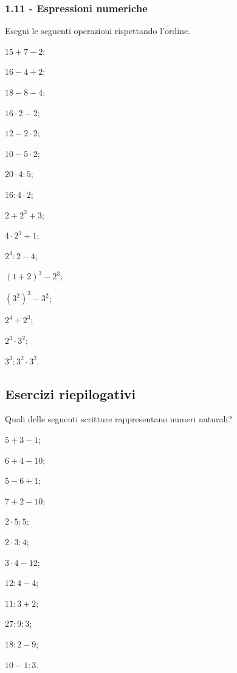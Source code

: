 \subsubsection*{1.11 - Espressioni numeriche}

\begin{esercizio}[\Ast]
\label{ese:1.27}
Esegui le seguenti operazioni rispettando l'ordine.
 \begin{multicols}{4}
 \begin{enumeratea}
 \item $15+7-2$;
 \item $16-4+2$;
 \item $18-8-4$;
 \item $16\cdot 2-2$;
 \item $12-2\cdot 2$;
 \item $10-5\cdot 2$;
 \item $20\cdot 4:5$;
 \item $16:4\cdot 2$;
 \item $2+2^2+3$;
 \item $4\cdot 2^3+1$;
 \item $2^4:2-4$;
 \item $(1+2)^3-2^3$;
 \item $(3^2)^3-3^2$;
 \item $2^4+2^3$;
 \item $2^3\cdot 3^2$;
 \item $3^3:3^2\cdot 3^2$.
 \end{enumeratea}
 \end{multicols}
\end{esercizio}

\subsection{Esercizi riepilogativi}
\begin{esercizio}[\Ast]
Quali delle seguenti scritture rappresentano numeri naturali?
 \begin{multicols}{4}
 \begin{enumeratea}
 \item $5+3-1$;
 \item $6+4-10$;
 \item $5-6+1$;
 \item $7+2-10$;
 \item $2\cdot 5:5$;
 \item $2\cdot 3:4$;
 \item $3\cdot 4-12$;
 \item $12:4-4$;
 \item $11:3+2$;
 \item $27:9:3$;
 \item $18:2-9$;
 \item $10-1:3$.
 \end{enumeratea}
 \end{multicols}
\end{esercizio}


